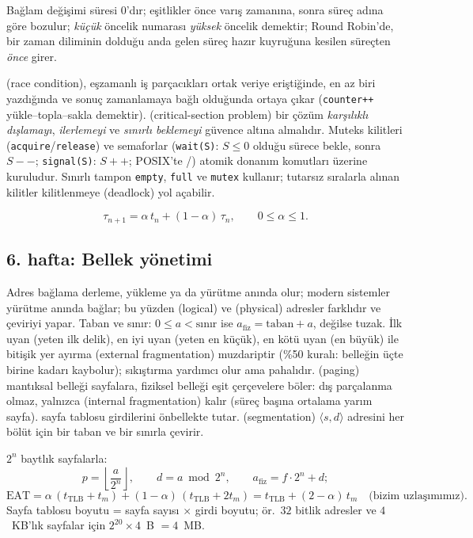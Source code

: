 \begin{keyidea}
Bağlam değişimi süresi $0$'dır; eşitlikler önce varış zamanına, sonra süreç adına göre bozulur; \emph{küçük} öncelik numarası \emph{yüksek} öncelik demektir; Round Robin'de, bir zaman diliminin dolduğu anda gelen süreç hazır kuyruğuna kesilen süreçten \emph{önce} girer.
\end{keyidea}

 (race condition), eşzamanlı iş parçacıkları ortak veriye eriştiğinde, en az biri yazdığında ve sonuç zamanlamaya bağlı olduğunda ortaya çıkar (\texttt{counter++} yükle--topla--sakla demektir).  (critical-section problem) bir çözüm \emph{karşılıklı dışlamayı}, \emph{ilerlemeyi} ve \emph{sınırlı beklemeyi} güvence altına almalıdır. Muteks kilitleri (\texttt{acquire}/\texttt{release}) ve semaforlar (\texttt{wait(S)}: $S \le 0$ olduğu sürece bekle, sonra $S{-}{-}$; \texttt{signal(S)}: $S{+}{+}$; POSIX'te /) atomik donanım komutları üzerine kuruludur. Sınırlı tampon \texttt{empty}, \texttt{full} ve \texttt{mutex} kullanır; tutarsız sıralarla alınan kilitler kilitlenmeye (deadlock) yol açabilir.
\begin{example}
\[
\tau_{n+1} = \alpha\, t_n + (1-\alpha)\,\tau_n, \qquad 0 \le \alpha \le 1.
\]
\end{example}

\subsection{6. hafta: Bellek yönetimi}
Adres bağlama derleme, yükleme ya da yürütme anında olur; modern sistemler yürütme anında bağlar; bu yüzden  (logical) ve  (physical) adresler farklıdır ve çeviriyi  yapar. Taban ve sınır: $0 \le a < \text{sınır}$ ise $a_{\text{fiz}} = \text{taban} + a$, değilse tuzak. İlk uyan (yeten ilk delik), en iyi uyan (yeten en küçük), en kötü uyan (en büyük) ile bitişik yer ayırma  (external fragmentation) muzdariptir (\%50 kuralı: belleğin üçte birine kadarı kaybolur); sıkıştırma yardımcı olur ama pahalıdır.  (paging) mantıksal belleği sayfalara, fiziksel belleği eşit çerçevelere böler: dış parçalanma olmaz, yalnızca  (internal fragmentation) kalır (süreç başına ortalama yarım sayfa).  sayfa tablosu girdilerini önbellekte tutar.  (segmentation) $\langle s, d\rangle$ adresini her bölüt için bir taban ve bir sınırla çevirir.
\begin{example}
$2^{n}$ baytlık sayfalarla:
\[
p = \left\lfloor \frac{a}{2^{n}} \right\rfloor,\qquad d = a \bmod 2^{n},\qquad a_{\text{fiz}} = f \cdot 2^{n} + d;
\]
\[
\text{EAT} = \alpha\,(t_{\text{TLB}} + t_m) + (1-\alpha)\,(t_{\text{TLB}} + 2t_m) = t_{\text{TLB}} + (2-\alpha)\,t_m \quad\text{(bizim uzlaşımımız)}.
\]
Sayfa tablosu boyutu = sayfa sayısı $\times$ girdi boyutu; ör.\ $32$ bitlik adresler ve $4$~KB'lık sayfalar için $2^{20} \times 4$~B $= 4$~MB.
\end{example}

